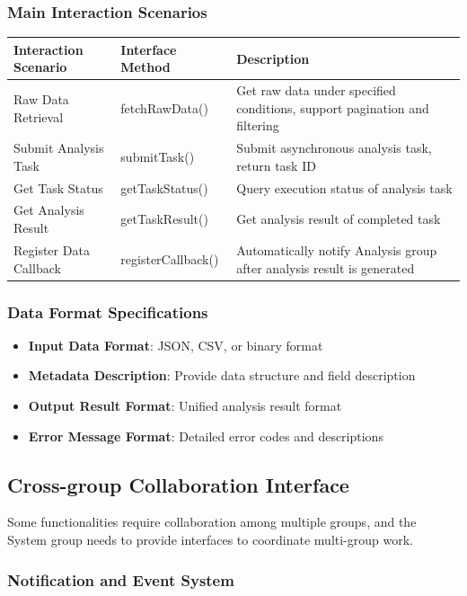 \documentclass[a4paper,12pt]{article}
\begin{document}
\subsubsection{Main Interaction Scenarios}

\begin{longtable}{|p{3cm}|p{4cm}|p{8cm}|}
\hline
\textbf{Interaction Scenario} & \textbf{Interface Method} & \textbf{Description} \\
\hline
\endhead
Raw Data Retrieval & fetchRawData() & Get raw data under specified conditions, support pagination and filtering \\
\hline
Submit Analysis Task & submitTask() & Submit asynchronous analysis task, return task ID \\
\hline
Get Task Status & getTaskStatus() & Query execution status of analysis task \\
\hline
Get Analysis Result & getTaskResult() & Get analysis result of completed task \\
\hline
Register Data Callback & registerCallback() & Automatically notify Analysis group after analysis result is generated \\
\hline
\end{longtable}

\subsubsection{Data Format Specifications}

\begin{itemize}
  \item \textbf{Input Data Format}: JSON, CSV, or binary format
  \item \textbf{Metadata Description}: Provide data structure and field description
  \item \textbf{Output Result Format}: Unified analysis result format
  \item \textbf{Error Message Format}: Detailed error codes and descriptions
\end{itemize}

\subsection{Cross-group Collaboration Interface}

Some functionalities require collaboration among multiple groups, and the System group needs to provide interfaces to coordinate multi-group work.

\subsubsection{Notification and Event System}
\end{document}
